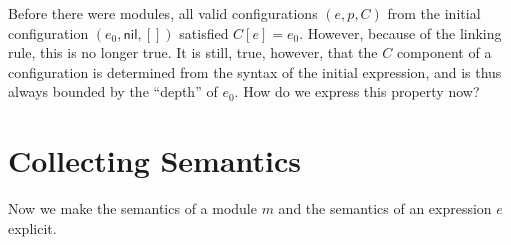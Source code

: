 \documentclass{article}
\begin{document}
\begin{prooftree*}
\end{prooftree*}

\begin{prooftree*}
\end{prooftree*}

Before there were modules, all valid configurations $(e, p, C)$ from the initial configuration $(e_{0}, \mathsf{nil}, [])$ satisfied $C[e]=e_{0}$.
However, because of the linking rule, this is no longer true.
It is still, true, however, that the $C$ component of a configuration is determined from the syntax of the initial expression, and is thus always bounded by the ``depth'' of $e_{0}$.
How do we express this property now?

\section{Collecting Semantics}

Now we make the semantics of a module $m$ and the semantics of an expression $e$ explicit.

\printbibliography
\end{document}
